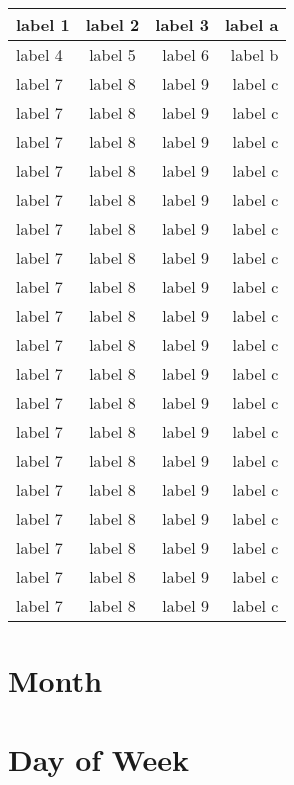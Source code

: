 \begin{center}
\begin{longtable}{ | l | c | r | r | }
          \hline
          label 1 & label 2 & label 3 & label a \\ 
          \hline
          label 4 & label 5 & label 6 & label b \\ 
          \hline
          label 7 & label 8 & label 9 & label c \\
          \hline
          label 7 & label 8 & label 9 & label c \\
          \hline
          label 7 & label 8 & label 9 & label c \\
          \hline
          label 7 & label 8 & label 9 & label c \\
          \hline
          label 7 & label 8 & label 9 & label c \\
          \hline
          label 7 & label 8 & label 9 & label c \\
          \hline
          label 7 & label 8 & label 9 & label c \\
          \hline
          label 7 & label 8 & label 9 & label c \\
          \hline
          label 7 & label 8 & label 9 & label c \\
          \hline
          label 7 & label 8 & label 9 & label c \\
          \hline
          label 7 & label 8 & label 9 & label c \\
          \hline
          label 7 & label 8 & label 9 & label c \\
          \hline
          label 7 & label 8 & label 9 & label c \\
          \hline
          label 7 & label 8 & label 9 & label c \\
          \hline
          label 7 & label 8 & label 9 & label c \\
          \hline
          label 7 & label 8 & label 9 & label c \\
          \hline
          label 7 & label 8 & label 9 & label c \\
          \hline
          label 7 & label 8 & label 9 & label c \\
          \hline
          label 7 & label 8 & label 9 & label c \\
          \hline
        \end{longtable}
      \end{center}
    \section{Month}
    \section{Day of Week}
